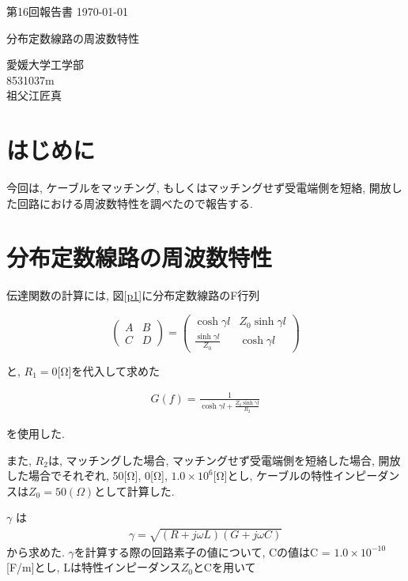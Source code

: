 \documentclass[a4j,12pt,]{jarticle}
\begin{document}
{\noindent\small 第16回報告書 \hfill\today}
\begin{center}
  {\Large 分布定数線路の周波数特性}
\end{center}
\begin{flushright}
  愛媛大学工学部 \\
  8531037m \\
  祖父江匠真 \\
\end{flushright}

\section{はじめに}

今回は, ケーブルをマッチング, もしくはマッチングせず受電端側を短絡, 開放した回路における周波数特性を調べたので報告する.

\section{分布定数線路の周波数特性}

伝達関数の計算には, 図\ref{p1}に分布定数線路のF行列

\large
\[
  \left(
  \begin{array}{cc}
      A & B \\
      C & D
    \end{array}
  \right) =
  \left(
  \begin{array}{cc}
      \cosh\gamma l             & Z_0\sinh\gamma l \\
      \frac{\sinh\gamma l}{Z_0} & \cosh\gamma l
    \end{array}
  \right)
\]
\normalsize

と, $R_1 = 0$[Ω]を代入して求めた

\large
\begin{eqnarray}
  G(f) =  \frac{1}{\cosh\gamma l + \frac{Z_0\sinh\gamma l}{R_2}}
\end{eqnarray}
\normalsize

を使用した.

また, $R_2$は, マッチングした場合, マッチングせず受電端側を短絡した場合, 開放した場合でそれぞれ, 50[Ω], 0[Ω], $1.0 × 10^{6}$[Ω]とし, ケーブルの特性インピーダンスは$Z_0 = 50(Ω)$として計算した.

$\gamma$ は
\begin{eqnarray}
  \gamma =  \sqrt{(R + j\omega L)(G + j\omega C)}
\end{eqnarray}
から求めた.
$\gamma$を計算する際の回路素子の値について, Cの値はC = $1.0 × 10^{-10}$[F/m]とし, Lは特性インピーダンス$Z_0$とCを用いて
\end{document}
